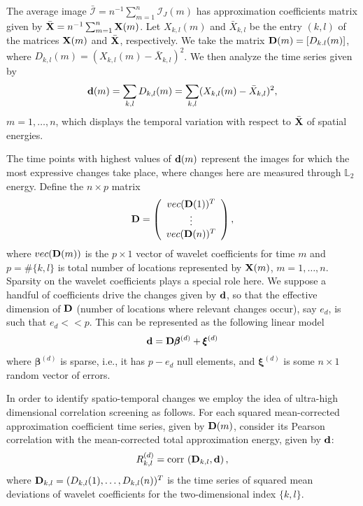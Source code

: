 \documentclass[journal]{IEEEtran}
\def\corr{\mbox{{\rm corr\,}}}
\newcommand{\vbeta}{\pmb{\beta}}
\newcommand{\vxi}{\pmb{\xi}}
\newcommand{\vD}{{\textbf D}}
\newcommand{\vd}{{\textbf d}}
\newcommand{\vX}{{\textbf X}}
\begin{document}
The average image $\bar{\mathcal{I}}=n^{-1}\sum_{m=1}^n\mathcal{I}_J(m)$ has approximation coefficients matrix given by $\bar{\vX} = n^{-1}\sum_{m=1}^n \vX(m)$. Let $X_{k,l}(m)$ and $\bar{X}_{k,l}$ be the entry $(k,l)$ of the matrices $\vX(m)$ and $\bar{\vX}$, respectively. We take the matrix $\vD(m) = [D_{k.l}(m)]$, where $D_{k,l}(m)=(X_{k,l}(m)-\bar{X}_{k,l})^2$. We then 
analyze the time series given by
\begin{equation} 
\vd(m)= \sum_{k,l}D_{k,l}(m) = \sum_{k,l}(X_{k,l}(m) - \bar{X}_{k,l})^2,
\label{eq_defdm}
\end{equation}
$m=1,\ldots,n$, which displays the temporal variation with respect to $\bar{\vX}$ of spatial energies.

The time points with highest values of $\vd(m)$ represent the images for which the most expressive changes take place, where changes here are measured through $\mathbb{L}_2$ energy. Define the  $n\times p$ matrix
\begin{equation}
 \vD=\left(
 \begin{array}{c}
 vec(\vD(1))^T\\
 \vdots\\
 vec(\vD(n))^T\\
 \end{array}
 \right),
\label{eq_defmatrixD}
\end{equation}
where $vec(\vD(m))$ is the $p\times 1$ vector of wavelet coefficients for time $m$ and $p=\#\{k,l\}$ is total number of locations represented by $\vX(m)$, $m=1,\ldots,n$. Sparsity \cite{johnstone2009statistical} on the wavelet coefficients plays a special role here.  We suppose a handful of coefficients drive the changes given by $\vd$, so that the effective dimension of $\vD$ (number of locations where relevant changes occur), say $e_d$, is such that $e_d<<p$. This can be represented as the following linear model
\begin{equation} 
\vd=\vD\vbeta^{(d)}+\vxi^{(d)}
\label{sparsemodel_d}
\end{equation}
where $\vbeta^{(d)}$ is sparse, i.e., it has $p-e_d$ null elements, and $\vxi^{(d)}$ is some $n\times 1$ random vector of errors.

 In order to identify spatio-temporal changes we employ the idea of ultra-high dimensional correlation screening \cite{fan2020statistical} as follows. For each squared mean-corrected approximation coefficient time series, given by $\vD(m)$, consider its Pearson correlation with the mean-corrected total approximation energy, given by $\vd$:
\begin{equation}
R_{k,l}^{(d)}= \corr\left( \vD_{k,l}, \vd\right),
\label{def_Rkld}
\end{equation}
where $\vD_{k,l}=(D_{k,l}(1),\ldots,D_{k,l}(n))^T$ is the time series of squared mean deviations of wavelet coefficients for the two-dimensional index $\{k,l\}$.
\end{document}
